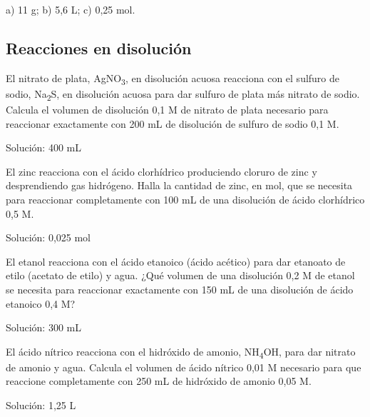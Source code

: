 \documentclass[
]{article}
\begin{document}
\begin{solution}a) 11 g; b) 5,6 L; c) 0,25 mol.\end{solution}

\hypertarget{reacciones-en-disoluciuxf3n}{%
\subsection{Reacciones en
disolución}\label{reacciones-en-disoluciuxf3n}}

\begin{exercise}El nitrato de plata, AgNO\textsubscript{3}, en
disolución acuosa reacciona con el sulfuro de sodio,
Na\textsubscript{2}S, en disolución acuosa para dar sulfuro de plata más
nitrato de sodio. Calcula el volumen de disolución 0,1 M de nitrato de
plata necesario para reaccionar exactamente con 200 mL de disolución de
sulfuro de sodio 0,1 M.

Solución: 400 mL\end{exercise}

\begin{exercise}El zinc reacciona con el ácido clorhídrico produciendo
cloruro de zinc y desprendiendo gas hidrógeno. Halla la cantidad de
zinc, en mol, que se necesita para reaccionar completamente con 100 mL
de una disolución de ácido clorhídrico 0,5 M.

Solución: 0,025 mol\end{exercise}

\begin{exercise}El etanol reacciona con el ácido etanoico (ácido
acético) para dar etanoato de etilo (acetato de etilo) y agua. ¿Qué
volumen de una disolución 0,2 M de etanol se necesita para reaccionar
exactamente con 150 mL de una disolución de ácido etanoico 0,4 M?

Solución: 300 mL\end{exercise}

\begin{exercise}El ácido nítrico reacciona con el hidróxido de amonio,
NH\textsubscript{4}OH, para dar nitrato de amonio y agua. Calcula el
volumen de ácido nítrico 0,01 M necesario para que reaccione
completamente con 250 mL de hidróxido de amonio 0,05 M.

Solución: 1,25 L\end{exercise}
\end{document}
